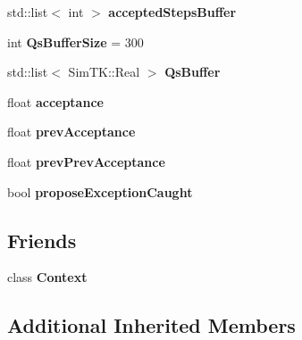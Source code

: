 \begin{DoxyCompactItemize}
\item 
std\+::list$<$ int $>$ {\bfseries accepted\+Steps\+Buffer}\hypertarget{classMonteCarloSampler_adf63689df579ac22e76d47380a0b6341}{}\label{classMonteCarloSampler_adf63689df579ac22e76d47380a0b6341}

\item 
int {\bfseries Qs\+Buffer\+Size} = 300\hypertarget{classMonteCarloSampler_a0720d9d5e4543b23006a5c7616269756}{}\label{classMonteCarloSampler_a0720d9d5e4543b23006a5c7616269756}

\item 
std\+::list$<$ Sim\+T\+K\+::\+Real $>$ {\bfseries Qs\+Buffer}\hypertarget{classMonteCarloSampler_aa1f3656e46752f5fe9f4868d2658d18a}{}\label{classMonteCarloSampler_aa1f3656e46752f5fe9f4868d2658d18a}

\item 
float {\bfseries acceptance}\hypertarget{classMonteCarloSampler_a1006f1adddf4666a094e6eb19c3065b7}{}\label{classMonteCarloSampler_a1006f1adddf4666a094e6eb19c3065b7}

\item 
float {\bfseries prev\+Acceptance}\hypertarget{classMonteCarloSampler_a8b725ad99341adf348645390311089e7}{}\label{classMonteCarloSampler_a8b725ad99341adf348645390311089e7}

\item 
float {\bfseries prev\+Prev\+Acceptance}\hypertarget{classMonteCarloSampler_ae59ce9e6f6d0fd91da053fecdba7b7ba}{}\label{classMonteCarloSampler_ae59ce9e6f6d0fd91da053fecdba7b7ba}

\item 
bool {\bfseries propose\+Exception\+Caught}\hypertarget{classMonteCarloSampler_af6b5f8a5682111329963b546b3f3de65}{}\label{classMonteCarloSampler_af6b5f8a5682111329963b546b3f3de65}

\end{DoxyCompactItemize}
\subsection*{Friends}
\begin{DoxyCompactItemize}
\item 
class {\bfseries Context}\hypertarget{classMonteCarloSampler_ac26c806e60ca4a0547680edb68f6e39b}{}\label{classMonteCarloSampler_ac26c806e60ca4a0547680edb68f6e39b}

\end{DoxyCompactItemize}
\subsection*{Additional Inherited Members}


